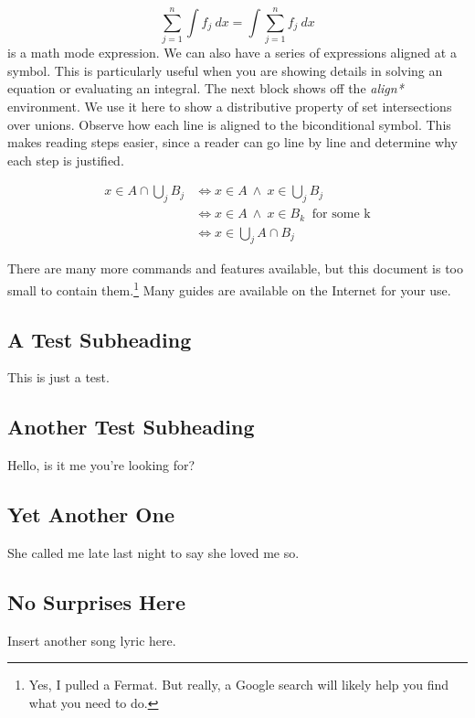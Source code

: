 \[ \sum_{j = 1} ^n \int f_j \ dx = \int \sum_{j = 1} ^n f_j \ dx \]
is a math mode expression. We can also have a series of expressions aligned at a symbol. This is particularly useful when you are showing details in solving an equation or evaluating an integral. The next block shows off the \textit{align*} environment. We use it here to show a distributive property of set intersections over unions. Observe how each line is aligned to the biconditional symbol. This makes reading steps easier, since a reader can go line by line and determine why each step is justified.

\begin{align*}
x \in A \cap \bigcup_{j} B_j &\iff x \in A \ \wedge \ x \in \bigcup_{j} B_j \\
&\iff x \in A \ \wedge \ x \in B_k \ \text{ for some k} \\
&\iff x \in \bigcup_{j} A \cap B_j
\end{align*}

There are many more commands and features available, but this document is too small to contain them.\footnote{Yes, I pulled a Fermat. But really, a Google search will likely help you find what you need to do.} Many guides are available on the Internet for your use.


\subsection{A Test Subheading}

This is just a test.

\subsection{Another Test Subheading}
Hello, is it me you're looking for?

\subsection{Yet Another One}
She called me late last night to say she loved me so.

\subsection{No Surprises Here}
Insert another song lyric here.

